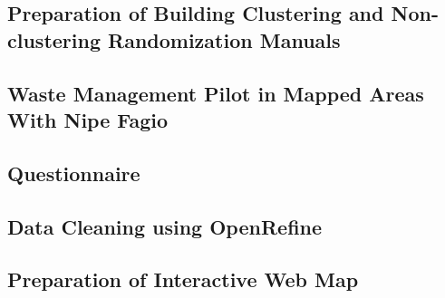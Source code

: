 \documentclass[a4paper,12pt,twoside]{article}
\begin{document}
\subsection{Preparation of Building Clustering and Non-clustering Randomization Manuals}

\begin{multicols}{2}
\lipsum[0-5]
\end{multicols}
\subsection{Waste Management Pilot in Mapped Areas With Nipe Fagio}

\begin{multicols}{2}
\lipsum[0-5]
\end{multicols}

\subsection{Questionnaire}

\begin{multicols}{2}
\lipsum[0-5]
\end{multicols}

\subsection{Data Cleaning using OpenRefine}

\begin{multicols}{2}
\lipsum[0-5]
\end{multicols}

\subsection{Preparation of Interactive Web Map}

\begin{multicols}{2}
\lipsum[0-5]
\end{multicols}
\end{document}

